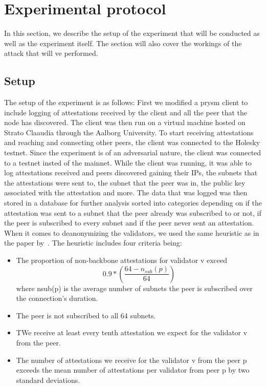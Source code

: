 

\section{Experimental protocol}\label{sec:experimental-protocol}
In this section, we describe the setup of the experiment that will be conducted as well as the experiment itself.
The section will also cover the workings of the attack that will ve performed.

\subsection{Setup}\label{subsec:setup}
The setup of the experiment is as follows: First we modified a prysm client to include logging of attestations received by the client and all the peer that the node has discovered.
The client was then run on a virtual machine hosted on Strato Claaudia through the Aalborg University.
To start receiving attestations and reaching and connecting other peers, the client was connected to the Holesky testnet.
Since the experiment is of an adversarial nature, the client was connected to a testnet insted of the mainnet.
While the client was running, it was able to log attestations received and peers discovered gaining their IPs, the subnets that the attestations were sent to, the subnet that the peer was in, the public key associated with the attestation and more.
The data that was logged was then stored in a database for further analysis sorted into categories depending on if the attestation was sent to a subnet that the peer already was subscribed to or not, if the peer is subscribed to every subnet and if the peer never sent an attestation.
When it comes to deanonymizing the validators, we used the same heuristic as in the paper by~\cite{heimbach2024deanonymizingethereumvalidatorsp2p}. 
The heuristic includes four criteria being:
\begin{itemize}
    \item The proportion of non-backbone attestations for validator v exceed
    \begin{equation}
                                                                                 0.9*\left(\frac{64-n_{sub}(p)}{64}\right)
                                                                                 \label{eq:heurestic}
    \end{equation} where nsub(p) is the average number of subnets the peer is subscribed over the connection’s duration.
    \item The peer is not subscribed to all 64 subnets.
    \item TWe receive at least every tenth attestation we expect for the validator v from the peer.
    \item The number of attestations we receive for the validator v from the peer p exceeds the mean number of attestations per validator from peer p by two standard deviations.
\end{itemize}
